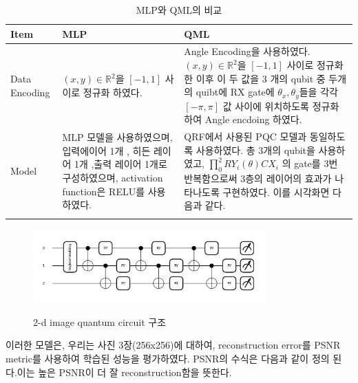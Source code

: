 \begin{itemize}
              \begin{table}[ht]
                    \centering
                    \begin{tabular}{ l||p{5.5cm}||p{5.5cm}}
                    \Xhline{3\arrayrulewidth}
                    \textbf{Item} & \textbf{MLP} & \textbf{QML} \\
                    \hline
                    Data Encoding & $(x,y) \in \mathbb{R}^2$을 $[-1 ,1]$ 사이로 정규화 하였다.    &
                    Angle Encoding을 사용하였다.$(x,y) \in \mathbb{R}^2$을 $[-1 ,1]$ 사이로 정규화한 이후 이 두 값을 3 개의 qubit 중 두개의 quibt에 RX gate에 $\theta_x ,\theta_y  $들을 각각 $ [-\pi ,\pi]$ 값 사이에 위치하도록 정규화하여  Angle encdoing 하였다.
                     \\
                    \hline
                    Model & MLP 모델을 사용하였으며, 입력에이어 1개 , 히든 레이어 1개 ,출력 레이어 1개로 구성하였으며, activation function은 RELU를 사용하였다. &
                    QRF에서 사용된 PQC 모델과 동일하도록 사용하였다. 총 3개의 qubit을 사용하였고, $ \prod_{0}^{2} RY_i(\theta)CX_i$ 의 gate를 3번 반복함으로써 3층의 레이어의 효과가 나타나도록 구현하였다. 이를 시각화면 다음과 같다.{fig:2d-image}
                     \\
                    \Xhline{3\arrayrulewidth}
                    \end{tabular}
                    \caption{MLP와 QML의 비교}
                    \label{tab:mlp_qml_comparison}
                \end{table}

                \begin{figure}[h]
                    \centering
                    \includegraphics[width=0.8\textwidth]{figs/pqc_2d}\
                \caption{2-d image quantum circuit 구조}
                \label{fig:2d-image}
                \end{figure}

                이러한 모델은, 우리는 사진 3장(256x256)에 대하여, reconstruction error를 PSNR metric를 사용하여 학습된 성능을 평가하였다. PSNR의 수식은 다음과 같이 정의 된다.이는 높은 PSNR이 더 잘 reconstruction함을 뜻한다.


\end{itemize}
